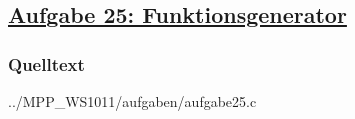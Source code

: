 \subsection*
{\href{http://cst.mi.fu-berlin.de/intern/19606-P-MPP/Aufgaben/040901.html}
{Aufgabe 25: Funktionsgenerator}}

\subsubsection*{Quelltext}


{../MPP_WS1011/aufgaben/aufgabe25.c}
